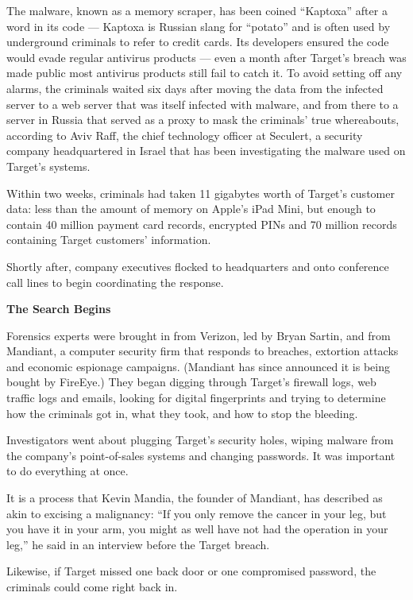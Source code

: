 The malware, known as a memory scraper, has been coined ``Kaptoxa''
after a word in its code --- Kaptoxa is Russian slang for ``potato'' and
is often used by underground criminals to refer to credit cards. Its
developers ensured the code would evade regular antivirus products ---
even a month after Target's breach was made public most antivirus
products still fail to catch it. To avoid setting off any alarms, the
criminals waited six days after moving the data from the infected server
to a web server that was itself infected with malware, and from there to
a server in Russia that served as a proxy to mask the criminals' true
whereabouts, according to Aviv Raff, the chief technology officer at
Seculert, a security company headquartered in Israel that has been
investigating the malware used on Target's systems.

Within two weeks, criminals had taken 11 gigabytes worth of Target's
customer data: less than the amount of memory on Apple's iPad Mini, but
enough to contain 40 million payment card records, encrypted PINs and 70
million records containing Target customers' information.

Shortly after, company executives flocked to headquarters and onto
conference call lines to begin coordinating the response.

\textbf{The Search Begins}

Forensics experts were brought in from Verizon, led by Bryan Sartin, and
from Mandiant, a computer security firm that responds to breaches,
extortion attacks and economic espionage campaigns. (Mandiant has since
announced it is being bought by FireEye.) They began digging through
Target's firewall logs, web traffic logs and emails, looking for digital
fingerprints and trying to determine how the criminals got in, what they
took, and how to stop the bleeding.

Investigators went about plugging Target's security holes, wiping
malware from the company's point-of-sales systems and changing
passwords. It was important to do everything at once.

It is a process that Kevin Mandia, the founder of Mandiant, has
described as akin to excising a malignancy: ``If you only remove the
cancer in your leg, but you have it in your arm, you might as well have
not had the operation in your leg,'' he said in an interview before the
Target breach.

Likewise, if Target missed one back door or one compromised password,
the criminals could come right back in.

